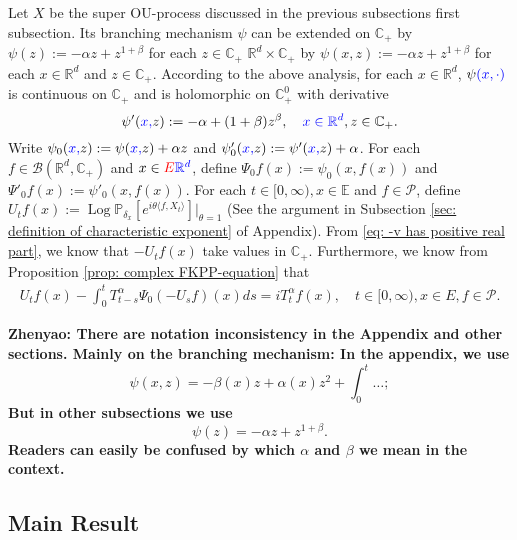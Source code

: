 \documentclass[12pt,oneside,english]{amsart}
\theoremstyle{plain}
\theoremstyle{definition}
\numberwithin{equation}{section}
\newcommand{\added}[1]{{\color{blue}#1}}\newcommand{\deleted}[1]{{\color{red}#1}}
\begin{document}
\subsection{}
    Let $X$ be the super OU-process discussed in the \deleted{previous subsections} \added{first subsection}.
    Its branching mechanism $\psi$ can be extended on \deleted{$\mathbb C_+$ by $\psi(z) := -\alpha z + z^{1+\beta}$ for each $z\in \mathbb C_+$} \added{$\mathbb R^d\times \mathbb C_+$ by $\psi(x, z) := -\alpha z + z^{1+\beta}$ for each $x\in \mathbb R^d$ and $z\in \mathbb C_+$}.
    According to the above analysis, \added{for each $x\in \mathbb R^d$}, $\psi\added{(x,\cdot)}$ is continuous on $\mathbb C_+$ and is holomorphic on $\mathbb C_+^0$ with derivative
\begin{equation}
\label{eq: deriavetive of the Poission part}
    \psi'(\added{x,}z) := -\alpha + (1+\beta)z^{\beta},
    \quad \added{x\in \mathbb R^d}, z\in \mathbb C_+.
\end{equation}
    Write $\psi_0(\added{x,}z) := \psi(\added{x,}z) + \alpha z$ and $\psi'_0(\added{x,}z) := \psi'(\added{x,}z) + \alpha$.
    For each $f\in \mathscr B(\mathbb R^d, \mathbb C_+)$ and $x\in \deleted{E}\added{\mathbb R^d}$, define $\Psi_0f(x) := \psi_0(x,f(x))$ and $\Psi'_0 f(x) := \psi'_0(x,f(x))$.
    For each $t\in [0,\infty), x\in \mathbb E$ and $f \in \mathcal{P}$, define $U_tf(x) := \operatorname{Log} \mathbb P_{\delta_x}[e^{i\theta \langle f, X_t\rangle}]|_{\theta = 1}$
    (See the argument in Subsection \ref{sec: definition of characteristic exponent} of Appendix).
    From \eqref{eq: -v has positive real part}, we know that $-U_tf(x)$ take values in $\mathbb C_+$. Furthermore, we know from Proposition \ref{prop: complex FKPP-equation} that
\begin{align}
\label{eq:chareq2}
    U_tf(x)-\int_0^t T^{\alpha}_{t-s} \Psi_0(-U_sf)(x)ds
    =i T^{\alpha}_t f(x),
    \quad t\in [0,\infty), x\in E, f\in \mathcal P.
\end{align}

    {\bf Zhenyao: There are notation inconsistency in the Appendix and other sections. Mainly on the branching mechanism: In the appendix, we use
\[
    \psi(x,z)= -\beta(x)z+\alpha(x)z^2 + \int_0^t \dots;
\]
    But in other subsections we use
\[
    \psi(z) = - \alpha z + z^{1+\beta}.
\]
    Readers can easily be confused by which $\alpha$ and $\beta$ we mean in the context.}

\subsection{Main Result}
\end{document}
